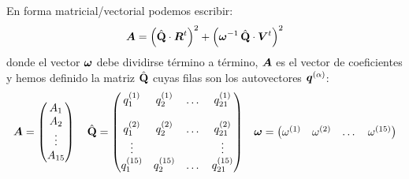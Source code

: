 En forma matricial/vectorial podemos escribir:
\begin{align*}
  \bm{A} = \left( \hat{\mathbf{Q}} \cdot \bm{R}^{t} \right)^{2} + \left( \boldsymbol{\omega}^{-1}\, \hat{\mathbf{Q}} \cdot \bm{V}^{t} \right)^{2} 
\end{align*}
donde el vector $\boldsymbol{\omega}$ debe dividirse t\'{e}rmino a t\'{e}rmino, $\bm{A}$ es el vector de coeficientes y hemos definido la matriz $\hat{\mathbf{Q}}$ cuyas filas son los autovectores $\bm{q}^{(\alpha)}$:
\begin{align*}
  \bm{A}=\begin{pmatrix} A_{1} \\ A_{2} \\ \vdots \\ A_{15}   \end{pmatrix}\, & & \hat{\mathbf{Q}} = \begin{pmatrix} 
q^{(1)}_{1} & q^{(1)}_{2} & \dots & q^{(1)}_{21} \\
&&&\\
q^{(2)}_{1} & q^{(2)}_{2} & \dots & q^{(2)}_{21} \\
\vdots &  &  & \vdots \\
q^{(15)}_{1} & q^{(15)}_{2} & \dots & q^{(15)}_{21} 
\end{pmatrix} &&
\boldsymbol{\omega} = \begin{pmatrix} \omega^{(1)} & \omega^{(2)} & \dots & \omega^{(15)}  \end{pmatrix}
\end{align*}

